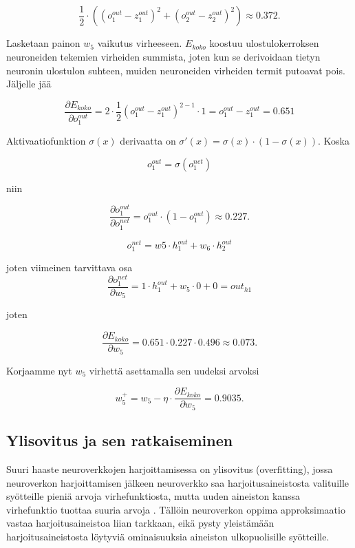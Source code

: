 \documentclass[finnish]{tktltiki2}
\theoremstyle{definition}
\theoremstyle{remark}
\begin{document}
  
  $$ \frac{1}{2} \cdot ( (o_{1}^{out} - z_1^{out})^2 + (o_{2}^{out} - z_2^{out})^2 ) \approx 0.372. $$


  Lasketaan painon $w_5$ vaikutus virheeseen. $E_{koko}$ koostuu ulostulokerroksen neuroneiden tekemien virheiden summista, joten kun se derivoidaan tietyn neuronin ulostulon suhteen, muiden neuroneiden virheiden termit putoavat pois. Jäljelle jää 
  
  $$ \frac{\partial E_{koko}}{\partial o_{1}^{out}} = 2 \cdot \frac{1}{2} (o_{1}^{out} - z_1^{out})^{2-1} \cdot 1 = o_{1}^{out} - z_1^{out} = 0.651$$

  Aktivaatiofunktion $\sigma (x)$ derivaatta on $\sigma'(x) = \sigma(x) \cdot (1 - \sigma(x))$.
  Koska 
  
  $$ o_{1}^{out} = \sigma(o_1^{net}) $$
  
  niin

  $$ \frac{\partial o_{1}^{out}}{\partial o_1^{net}} = o_{1}^{out} \cdot (1 - o_{1}^{out}) \approx 0.227.$$

  $$ o_1^{net} = w5 \cdot h_{1}^{out} + w_6 \cdot h_{2}^{out} $$
  
  joten viimeinen tarvittava osa 
  $$ \frac{\partial o_1^{net}}{\partial w_5} = 1 \cdot h_{1}^{out} + w_5 \cdot 0 + 0 = out_{h1} $$ 

  joten 
  
  $$\frac{\partial E_{koko}}{\partial w_5} = 0.651 \cdot 0.227 \cdot 0.496 \approx 0.073. $$

   Korjaamme nyt $w_5$ virhettä asettamalla sen uudeksi arvoksi

  $$w_{5}^+ = w_5 - \eta \cdot \frac{\partial E_{koko}}{\partial w_5} = 0.9035.$$





  \subsection{Ylisovitus ja sen ratkaiseminen}

  Suuri haaste neuroverkkojen harjoittamisessa on ylisovitus (overfitting), jossa neuroverkon harjoittamisen jälkeen neuroverkko saa harjoitusaineistosta valituille syötteille pieniä arvoja virhefunktiosta, mutta uuden aineiston kanssa virhefunktio tuottaa suuria arvoja \cite{Nielsen-neural}. Tällöin neuroverkon oppima approksimaatio vastaa harjoitusaineistoa liian tarkkaan, eikä pysty yleistämään harjoitusaineistosta löytyviä ominaisuuksia aineiston ulkopuolisille syötteille.   
\end{document}
